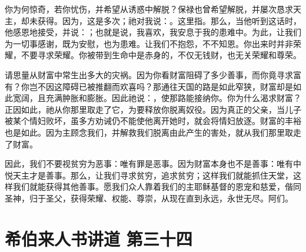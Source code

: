 你为何惊奇，若你忧伤，并希望从诱惑中解脱？保禄也曾希望解脱，并屡次恳求天主，却未获得。因为，这是多次；祂对我说：。这里指。那么，当他听到这话时，他感恩地接受，并说：；也就是说，我喜欢，我安息于我的患难中。为此，让我们为一切事感谢，既为安慰，也为患难。让我们不抱怨，不不知恩。你出来时并非荣耀，不要寻求荣耀。你被带到生命中是赤身的，不仅无钱财，也无关荣耀和尊荣。\par

请思量从财富中常生出多大的灾祸。因为你看财富阻碍了多少善事，而你竟寻求富有？你岂不因这障碍已被推翻而欢喜吗？那通往天国的路是如此窄狭，财富却是如此宽阔，且充满肿胀和膨胀。因此祂说：，使那路能接纳你。你为什么渴求财富？正因如此，祂从你那里取走了它，为要释放你脱离奴役。因为真正的父亲，当儿子被某个情妇败坏，虽多方劝诫仍不能使他离开她时，就会将情妇放逐。财富的丰裕也是如此。因为主顾念我们，并解救我们脱离由此产生的害处，就从我们那里取走了财富。\par

因此，我们不要视贫穷为恶事：唯有罪是恶事。因为财富本身也不是善事：唯有中悦天主才是善事。那么，让我们寻求贫穷，追求贫穷；这样我们就能抓住天堂，这样我们就能获得其他善事。愿我们众人靠着我们的主耶稣基督的恩宠和慈爱，偕同圣神，归于圣父，获得荣耀、权能、尊崇，从现在直到永远，永世无尽。阿们。\par



\section{希伯来人书讲道 第三十四}


\subsection{}

